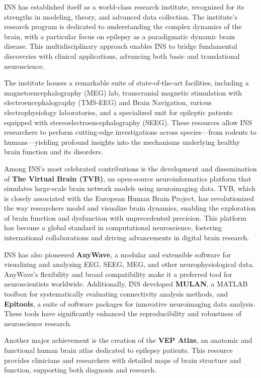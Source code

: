 \documentclass[a4paper,12pt,twoside]{article}
\begin{document}
INS has established itself as a world-class research institute, recognized for its strengths in modeling, theory, and advanced data collection. The institute’s research program is dedicated to understanding the complex dynamics of the brain, with a particular focus on epilepsy as a paradigmatic dynamic brain disease. This multidisciplinary approach enables INS to bridge fundamental discoveries with clinical applications, advancing both basic and translational neuroscience.

The institute houses a remarkable suite of state-of-the-art facilities, including a magnetoencephalography (MEG) lab, transcranial magnetic stimulation with electroencephalography (TMS-EEG) and Brain Navigation, various electrophysiology laboratories, and a specialized unit for epileptic patients equipped with stereoelectroencephalography (SEEG). These resources allow INS researchers to perform cutting-edge investigations across species---from rodents to humans---yielding profound insights into the mechanisms underlying healthy brain function and its disorders.



Among INS’s most celebrated contributions is the development and dissemination of \textbf{The Virtual Brain (TVB)}, an open-source neuroinformatics platform that simulates large-scale brain network models using neuroimaging data. TVB, which is closely associated with the European Human Brain Project, has revolutionized the way researchers model and visualize brain dynamics, enabling the exploration of brain function and dysfunction with unprecedented precision. This platform has become a global standard in computational neuroscience, fostering international collaborations and driving advancements in digital brain research.

INS has also pioneered \textbf{AnyWave}, a modular and extensible software for visualizing and analyzing EEG, SEEG, MEG, and other neurophysiological data. AnyWave’s flexibility and broad compatibility make it a preferred tool for neuroscientists worldwide. Additionally, INS developed \textbf{MULAN}, a MATLAB toolbox for systematically evaluating connectivity analysis methods, and \textbf{Epitools}, a suite of software packages for innovative neuroimaging data analysis. These tools have significantly enhanced the reproducibility and robustness of neuroscience research.

Another major achievement is the creation of the \textbf{VEP Atlas}, an anatomic and functional human brain atlas dedicated to epilepsy patients. This resource provides clinicians and researchers with detailed maps of brain structure and function, supporting both diagnosis and research.
\end{document}

